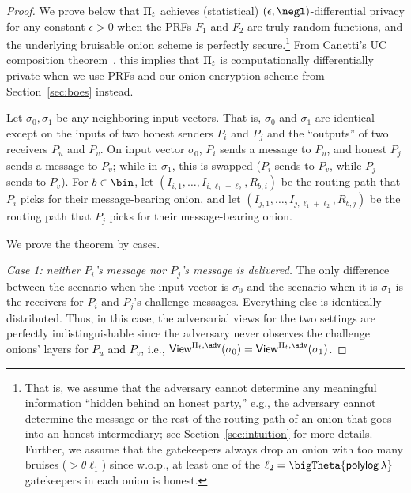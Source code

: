 \documentclass[runningheads,a4paper]{llncs}
\begin{document}
\begin{proof}
We prove below that $\Pi_t$ achieves (statistical) $(\epsilon, \negl)$-differential privacy for any constant $\epsilon>0$ when the PRFs $F_1$ and $F_2$ are truly random functions, and the underlying bruisable onion scheme is perfectly secure.\footnote{That is, we assume that the adversary cannot determine any meaningful information ``hidden behind an honest party,'' e.g., the adversary cannot determine the message or the rest of the routing path of an onion that goes into an honest intermediary; see Section~\ref{sec:intuition} for more details. Further, we assume that the gatekeepers always drop an onion with too many bruises ($> \theta\ell_1$) since w.o.p., at least one of the $\ell_2 = \bigTheta{\polylog \thinspace\secpar}$ gatekeepers in each onion is honest.}
From Canetti's UC composition theorem~\cite{FOCS:Canetti01}, this implies that $\Pi_t$ is computationally differentially private when we use PRFs and our onion encryption scheme from Section~\ref{sec:boes} instead. 

Let $\sigma_0, \sigma_1$ be any neighboring input vectors. That is, $\sigma_0$ and $\sigma_1$ are identical except on the inputs of two honest senders $P_i$ and $P_j$ and the ``outputs'' of two receivers $P_u$ and $P_v$. On input vector $\sigma_0$, $P_i$ sends a message to $P_u$, and honest $P_j$ sends a message to $P_v$; while in $\sigma_1$, this is swapped ($P_i$ sends to $P_v$, while $P_j$ sends to $P_v$). 
For $b\in\bin$, let $(I_{i, 1}, \dots, I_{i, \ell_1+\ell_2}, R_{b,i})$ be the routing path that $P_i$ picks for their message-bearing onion, and let $(I_{j, 1}, \dots, I_{j, \ell_1+\ell_2}, R_{b, j})$ be the routing path that $P_j$ picks for their message-bearing onion.  %

We prove the theorem by cases. 

\medskip
\noindent \emph{Case 1: neither $P_i$'s message nor $P_j$'s message is delivered.} The only difference between the scenario when the input vector is $\sigma_0$ and the scenario when it is $\sigma_1$ is the receivers for $P_i$ and $P_j$'s challenge messages. Everything else is identically distributed. Thus, in this case, the adversarial views for the two settings are perfectly indistinguishable since the adversary never observes the challenge onions' layers for \textcolor{black}{$P_u$ and $P_v$}, i.e., $\mathsf{View}^{\protocol, \adv}(\sigma_0) = \mathsf{View}^{\protocol, \adv}(\sigma_1)$. 


\end{proof}
\end{document}
